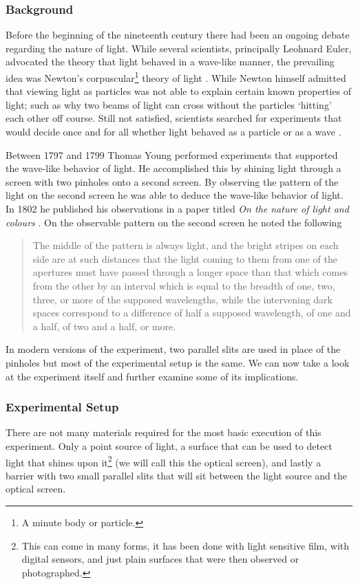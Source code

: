 \documentclass[authoryearcitations]{UoYCSproject}
\begin{document}
\subsubsection{Background}
Before the beginning of the nineteenth century there had been an ongoing debate regarding the nature of light. While
several scientists, principally Leohnard Euler, advocated the theory that light behaved in a wave-like manner, the prevailing 
idea was Newton's corpuscular\footnote{A minute body or particle.} theory of light \cite{history}. While Newton himself admitted 
that viewing light as particles was not able to explain certain known properties of light; such as why two beams of light
can cross without the particles `hitting' each other off course. Still not satisfied, scientists searched for experiments that
would decide once and for all whether light behaved as a particle or as a wave \cite{history}. 

Between 1797 and 1799 Thomas Young performed experiments that supported the wave-like behavior of light. He accomplished this
by shining light through a screen with two pinholes onto a second screen. By observing the pattern of the light on the second 
screen he was able to deduce the wave-like behavior of light. In 1802 he published his observations in a paper titled \emph{On
the nature of light and colours} \cite{ralph}. On the observable pattern on the second screen he noted the following

\begin{quote}
The middle of the pattern is always light, and the bright stripes on each side are at such distances that the light coming to them from one of the apertures must have passed through a longer space than that which comes from the other by an interval which is equal to the breadth of one, two, three, or more of the supposed wavelengths, while the intervening dark spaces correspond to a difference of half a supposed wavelength, of one and a half, of two and a half, or more.
\end{quote}


In modern versions of the experiment, two parallel slits are used in place of the pinholes but most of the experimental setup 
is the same. We can now take a look at the experiment itself and further examine some of its implications. 

\subsubsection{Experimental Setup}
There are not many materials required for the most basic execution of this experiment. Only a point source of light, a
surface that can be used to detect light that shines upon it\footnote{This can come in many forms, it has been done with light
sensitive film, with digital sensors, and just plain surfaces that were then observed or photographed.} (we will call this the 
optical screen), and lastly a 
barrier with two small parallel slits that will sit between the light source and the optical screen. 
\end{document}
